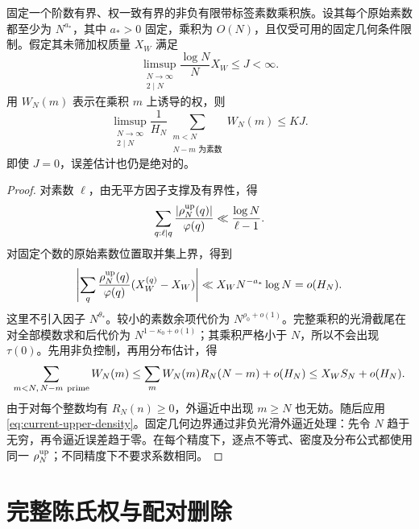\begin{proposition}[非负乘积族的推论]
\label{prop:current-positive-product}
固定一个阶数有界、权一致有界的非负有限带标签素数乘积族。设其每个原始素数都至少为 $N^{a_*}$，其中 $a_*>0$ 固定，乘积为 $O(N)$，且仅受可用的固定几何条件限制。假定其未筛加权质量 $X_W$ 满足
\[
 \limsup_{\substack{N\to\infty\\2\mid N}}
             \frac{\log N}{N}X_W\le J<\infty.
\]
用 $W_N(m)$ 表示在乘积 $m$ 上诱导的权，则
\[
 \limsup_{\substack{N\to\infty\\2\mid N}}\frac1{H_N}
       \sum_{\substack{m<N\\N-m\text{ 为素数}}}W_N(m)\le KJ.
\]
即使 $J=0$，误差估计也仍是绝对的。
\end{proposition}

\begin{proof}
对素数 $\ell$，由无平方因子支撑及有界性，得
\[
 \sum_{q:\ell\mid q}\frac{|\rho_N^{\rm up}(q)|}{\varphi(q)}
       \ll\frac{\log N}{\ell-1}.
\]
对固定个数的原始素数位置取并集上界，得到
\begin{equation}
 \left|\sum_q\frac{\rho_N^{\rm up}(q)}{\varphi(q)}
                         (X_W^{(q)}-X_W)\right|
       \ll X_WN^{-a_*}\log N=o(H_N).
 \label{eq:current-coprime-correction}
\end{equation}
这里不引入因子 $N^{\theta_*}$。较小的素数余项代价为 $N^{\rho_0+o(1)}$。完整乘积的光滑截尾在对全部模数求和后代价为 $N^{1-\kappa_0+o(1)}$；其乘积严格小于 $N$，所以不会出现 $\tau(0)$。先用非负控制，再用分布估计，得
\[
 \sum_{m<N,\,N-m\ {\rm prime}}W_N(m)
 \le\sum_m W_N(m)R_N(N-m)+o(H_N)
 \le X_WS_N+o(H_N).
\]
由于对每个整数均有 $R_N(n)\ge0$，外逼近中出现 $m\ge N$ 也无妨。随后应用 \eqref{eq:current-upper-density}。固定几何边界通过非负光滑外逼近处理：先令 $N$ 趋于无穷，再令逼近误差趋于零。在每个精度下，逐点不等式、密度及分布公式都使用同一 $\rho_N^{\rm up}$；不同精度下不要求系数相同。
\end{proof}

\section{完整陈氏权与配对删除}
\label{sec:current-chen-weight}

